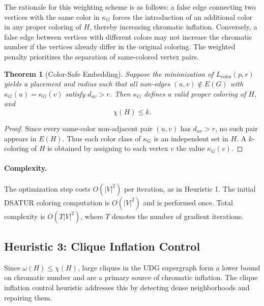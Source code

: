 \documentclass[11pt]{article}
\newtheorem{theorem}{Theorem}
\begin{document}
The rationale for this weighting scheme is as follows: a false edge connecting two vertices with the same color in $\kappa_G$ forces the introduction of an additional color in any proper coloring of $H$, thereby increasing chromatic inflation. Conversely, a false edge between vertices with different colors may not increase the chromatic number if the vertices already differ in the original coloring. The weighted penalty prioritizes the separation of same-colored vertex pairs.

\begin{theorem}[Color-Safe Embedding]
\label{thm:colorsafe}
Suppose the minimization of $L_{\mathrm{color}}(p,r)$ yields a placement and radius such that all non-edges $(u,v)\notin E(G)$ with $\kappa_G(u)=\kappa_G(v)$ satisfy $d_{uv}>r$. Then $\kappa_G$ defines a valid proper coloring of $H$, and
\[
\chi(H) \leq k.
\]
\end{theorem}

\begin{proof}
Since every same-color non-adjacent pair $(u,v)$ has $d_{uv}>r$, no such pair appears in $E(H)$. Thus each color class of $\kappa_G$ is an independent set in $H$. A $k$-coloring of $H$ is obtained by assigning to each vertex $v$ the value $\kappa_G(v)$.
\end{proof}

\paragraph{Complexity.}
The optimization step costs $O(|V|^2)$ per iteration, as in Heuristic 1. The initial DSATUR coloring computation is $O(|V|^2)$ and is performed once. Total complexity is $O(T|V|^2)$, where $T$ denotes the number of gradient iterations.

\newpage

\subsection{Heuristic 3: Clique Inflation Control}

Since $\omega(H) \le \chi(H)$, large cliques in the UDG supergraph form a lower bound on chromatic number and are a primary source of chromatic inflation. The clique inflation control heuristic addresses this by detecting dense neighborhoods and repairing them.
\end{document}

